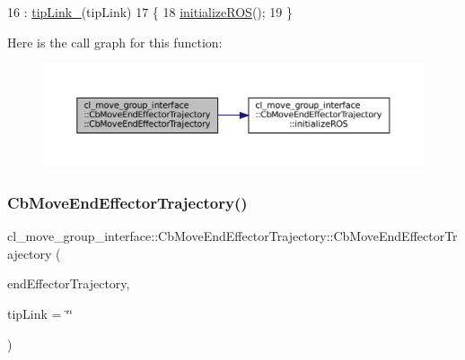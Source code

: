 \begin{DoxyCode}
16         : \hyperlink{classcl__move__group__interface_1_1CbMoveEndEffectorTrajectory_a24c6c30b9b0761a61fa002d947bd3e11}{tipLink\_}(tipLink)
17     \{
18         \hyperlink{classcl__move__group__interface_1_1CbMoveEndEffectorTrajectory_afcee8f3853a5cef8806137a304c8a14b}{initializeROS}();
19     \}
\end{DoxyCode}
Here is the call graph for this function\+:
\nopagebreak
\begin{figure}[H]
\begin{center}
\leavevmode
\includegraphics[width=350pt]{classcl__move__group__interface_1_1CbMoveEndEffectorTrajectory_af7e718b0c53e912fd74968abbb0a4810_cgraph}
\end{center}
\end{figure}
\mbox{\label{classcl__move__group__interface_1_1CbMoveEndEffectorTrajectory_ae6985de3f8f0e1ec7dea88c1e551889a}} 
\subsubsection{\texorpdfstring{Cb\+Move\+End\+Effector\+Trajectory()}{CbMoveEndEffectorTrajectory()}\hspace{0.1cm}{\footnotesize\ttfamily [2/2]}}
{\footnotesize\ttfamily cl\+\_\+move\+\_\+group\+\_\+interface\+::\+Cb\+Move\+End\+Effector\+Trajectory\+::\+Cb\+Move\+End\+Effector\+Trajectory (\begin{DoxyParamCaption}\item[{const std\+::vector$<$ geometry\+\_\+msgs\+::\+Pose\+Stamped $>$ \&}]{end\+Effector\+Trajectory,  }\item[{std\+::string}]{tip\+Link = {\ttfamily \char`\"{}\char`\"{}} }\end{DoxyParamCaption})}



